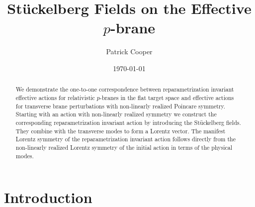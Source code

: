 \documentclass[%
 reprint,
 amsmath,amssymb,
 aps,
]{revtex4-1}
\begin{document}

\title{St\"uckelberg Fields on the Effective $p$-brane}

\author{Patrick Cooper}

\date{\today}

\begin{abstract}
    We  demonstrate the one-to-one correspondence between reparametrization invariant effective actions for relativistic  $p$-branes
    in the flat target space and effective actions for transverse brane perturbations with non-linearly realized Poincare symmetry.
  Starting with an action with non-linearly realized symmetry we construct the corresponding reparametrization invariant action by introducing
  the St\"uckelberg fields. They combine with the transverse modes to form a Lorentz vector. The manifest Lorentz symmetry of the reparametrization invariant action
  follows directly from the non-linearly  realized Lorentz symmetry of the initial action in terms of the physical modes.
    \end{abstract}

\maketitle


\section{\label{sec:level1}Introduction}
\end{document}
